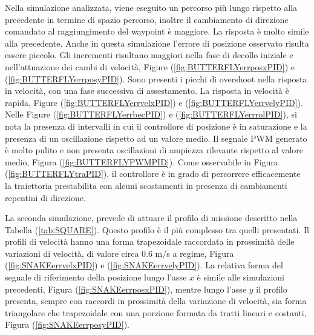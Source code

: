 Nella simulazione analizzata, viene eseguito un percorso più lungo rispetto alla precedente in termine di spazio percorso, inoltre il cambiamento di direzione comandato al raggiungimento del waypoint è maggiore. La risposta è molto simile alla precedente. Anche in questa simulazione l'errore di posizione osservato risulta essere piccolo. Gli incrementi risultano maggiori nella fase di decollo iniziale e nell'attuazione dei cambi di velocità, Figure (\ref{fig:BUTTERFLYerrposxPID}) e (\ref{fig:BUTTERFLYerrposyPID}). Sono presenti i picchi di overshoot nella risposta in velocità, con una fase successiva di assestamento. La risposta in velocità è rapida, Figure (\ref{fig:BUTTERFLYerrvelxPID}) e (\ref{fig:BUTTERFLYerrvelyPID}). Nelle Figure (\ref{fig:BUTTERFLYerrbecPID}) e (\ref{fig:BUTTERFLYerrrolPID}), si nota la presenza di intervalli in cui il controllore di posizione è in saturazione e la presenza di un oscillazione rispetto ad un valore medio. Il segnale PWM generato è molto pulito e non presenta oscillazioni di ampiezza rilevante rispetto al valore medio, Figura (\ref{fig:BUTTERFLYPWMPID}). Come osservabile in Figura (\ref{fig:BUTTERFLYtraPID}), il controllore è in grado di percorrere efficacemente la traiettoria prestabilita con alcuni scostamenti in presenza di cambiamenti repentini di direzione.

La seconda simulazione, prevede di attuare il profilo di missione descritto nella Tabella (\ref{tab:SQUARE}). Questo profilo è il più complesso tra quelli presentati. Il profili di velocità hanno una forma trapezoidale raccordata in prossimità delle variazioni di velocità, di valore circa 0.6 m/s a regime, Figura (\ref{fig:SNAKEerrvelxPID}) e (\ref{fig:SNAKEerrvelyPID}). La relativa forma del segnale di riferimento della posizione lungo l'asse $x$ è simile alle simulazioni precedenti, Figura (\ref{fig:SNAKEerrposxPID}), mentre lungo l'asse $y$ il profilo presenta, sempre con raccordi in prossimità della variazione di velocità, sia forma triangolare che trapezoidale con una porzione formata da tratti lineari e costanti, Figura (\ref{fig:SNAKEerrposyPID}).

